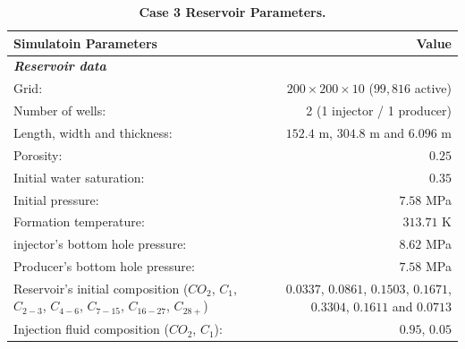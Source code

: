 \FloatBarrier
\begin{center}
\begin{table}[h!]
\begin{adjustbox}{width=\textwidth}
    \begin{threeparttable}
    \caption{\textbf{Case 3 Reservoir Parameters\supercite{fernandes}.}}
    \label{case1}
        \begin{tabular}{l r }
            \toprule
            Simulatoin Parameters & Value\\
            \midrule
	\rowcolor{red!20}\textit{\textbf{Reservoir data}}      & \\
	Grid:      &           $200\times200\times10$ ($99,816$ active) \\
	\rowcolor{blue!5}Number of wells:      &  2 (1 injector / 1 producer) \\
	Length, width and thickness:      & $152.4$ m, $304.8$ m and $6.096$ m\\
	\rowcolor{blue!5}Porosity:       &          $0.25$ \\
	Initial water saturation:    & $0.35$ \\      
	\rowcolor{blue!5}Initial pressure:    &      $7.58$ MPa\\
	Formation temperature:    & $313.71$ K     \\
	injector's bottom hole pressure:    &       $8.62$ MPa \\
	\rowcolor{blue!5}Producer’s bottom hole pressure:    &       $7.58$ MPa\\
	Reservoir’s initial composition ($CO_{2}$, $C_{1}$, $C_{2-3}$, $C_{4-6}$, $C_{7-15}$, $C_{16-27}$, $C_{28+}$) & $0.0337$, $0.0861$, $0.1503$, $0.1671$, $0.3304$, $0.1611$ and $0.0713$\\
	\rowcolor{blue!5}Injection ﬂuid composition ($CO_{2}$, $C_{1}$):    &   $0.95$, $0.05$\\
        \bottomrule
        \end{tabular}
    \end{threeparttable}
\end{adjustbox}    
\end{table}
\end{center}
\FloatBarrier

